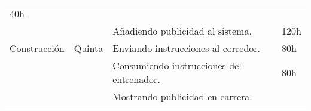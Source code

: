 \begin{longtable}[c]{@{}llll@{}}
\begin{minipage}[t]{0.12\columnwidth}
40h
\end{minipage}
\\\noalign{\medskip}
\begin{minipage}[t]{0.17\columnwidth}\raggedright
\end{minipage} & \begin{minipage}[t]{0.12\columnwidth}\raggedright
\end{minipage} & \begin{minipage}[t]{0.58\columnwidth}\raggedright
Añadiendo publicidad al sistema.
\end{minipage} & \begin{minipage}[t]{0.12\columnwidth}\raggedright
120h
\end{minipage}
\\\noalign{\medskip}
\begin{minipage}[t]{0.17\columnwidth}\raggedright
Construcción
\end{minipage} & \begin{minipage}[t]{0.12\columnwidth}\raggedright
Quinta
\end{minipage} & \begin{minipage}[t]{0.58\columnwidth}\raggedright
Enviando instrucciones al corredor.
\end{minipage} & \begin{minipage}[t]{0.12\columnwidth}\raggedright
80h
\end{minipage}
\\\noalign{\medskip}
\begin{minipage}[t]{0.17\columnwidth}\raggedright
\end{minipage} & \begin{minipage}[t]{0.12\columnwidth}\raggedright
\end{minipage} & \begin{minipage}[t]{0.58\columnwidth}\raggedright
Consumiendo instrucciones del entrenador.
\end{minipage} & \begin{minipage}[t]{0.12\columnwidth}\raggedright
80h
\end{minipage}
\\\noalign{\medskip}
\begin{minipage}[t]{0.17\columnwidth}\raggedright
\end{minipage} & \begin{minipage}[t]{0.12\columnwidth}\raggedright
\end{minipage} & \begin{minipage}[t]{0.58\columnwidth}\raggedright
Mostrando publicidad en carrera.

\end{minipage}
\end{longtable}
